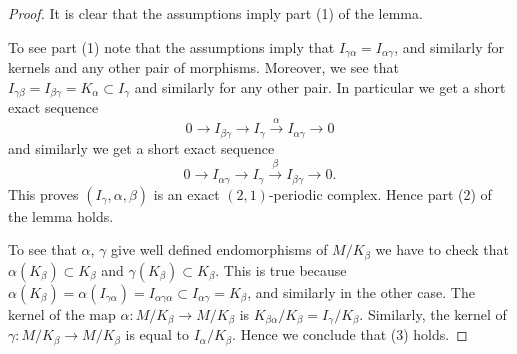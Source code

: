 \begin{proof}
It is clear that the assumptions imply part (1) of the lemma.

\medskip\noindent
To see part (1) note that the assumptions imply that
$I_{\gamma\alpha} = I_{\alpha\gamma}$, and similarly for kernels
and any other pair of morphisms.
Moreover, we see that
$I_{\gamma\beta} =I_{\beta\gamma} = K_\alpha \subset I_\gamma$ and
similarly for any other pair. In particular we get a short exact sequence
$$
0 \to I_{\beta\gamma} \to I_\gamma \xrightarrow{\alpha} I_{\alpha\gamma} \to 0
$$
and similarly we get a short exact sequence
$$
0 \to I_{\alpha\gamma} \to I_\gamma \xrightarrow{\beta} I_{\beta\gamma} \to 0.
$$
This proves $(I_\gamma, \alpha, \beta)$ is an exact $(2, 1)$-periodic
complex. Hence part (2) of the lemma holds.

\medskip\noindent
To see that $\alpha$, $\gamma$ give well defined endomorphisms
of $M/K_\beta$ we have to check that $\alpha(K_\beta) \subset K_\beta$
and $\gamma(K_\beta) \subset K_\beta$. This is true because
$\alpha(K_\beta) = \alpha(I_{\gamma\alpha}) = I_{\alpha\gamma\alpha}
\subset I_{\alpha\gamma} = K_\beta$, and similarly in the other case.
The kernel of the map $\alpha : M/K_\beta \to M/K_\beta$ is
$K_{\beta\alpha}/K_\beta = I_\gamma/K_\beta$. Similarly,
the kernel of $\gamma : M/K_\beta \to M/K_\beta$ is equal to
$I_\alpha/K_\beta$. Hence we conclude that (3) holds.


\end{proof}
